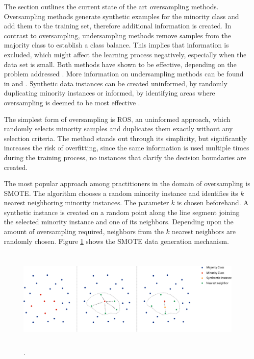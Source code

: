 \documentclass[parskip=full]{scrartcl}
\begin{document}
The section outlines the current state of the art oversampling methods. Oversampling methods generate synthetic examples for the minority class and add them to the training set, therefore additional information is created. In contrast to oversampling, undersampling methods remove samples from the majority class to establish a class balance. This implies that information is excluded, which might affect the learning process negatively, especially when the data set is small. Both methods have shown to be effective, depending on the problem addressed \cite{Chawla2002}. More information on undersampling methods can be found in \cite{Ganganwar2012} and \cite{Yen2006}. Synthetic data instances can be created uninformed, by randomly duplicating minority instances or informed, by identifying areas where oversampling is deemed to be most effective \cite{Douzas2018}.

The simplest form of oversampling is ROS, an uninformed approach, which randomly selects minority samples and duplicates them exactly without any selection criteria. The method stands out through its simplicity, but significantly increases the risk of overfitting, since the same information is used multiple times during the training process, no instances that clarify the decision boundaries are created.

The most popular approach among practitioners in the domain of oversampling is SMOTE. The algorithm chooses a random minority instance and identifies its $ k $ nearest neighboring minority instances. The parameter $ k $ is chosen beforehand. A synthetic instance is created on a random point along the line segment joining the selected minority instance and one of its neighbors. Depending upon the amount of oversampling required, neighbors from the $ k $ nearest neighbors are randomly chosen. Figure \ref{fig:Schubach} shows the SMOTE data generation mechanism.

\begin{figure}[H]
	\centering
	\includegraphics[width=16.5cm, height=5cm, keepaspectratio]{../analysis/fig1.png}
	.
	\label{fig:Schubach}
\end{figure}
\end{document}
